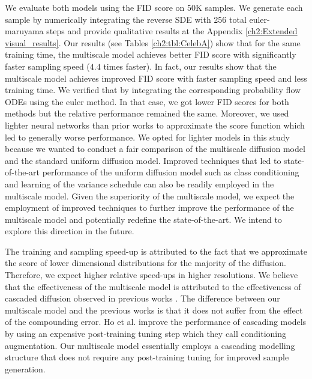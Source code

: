 We evaluate both models using the FID score on 50K samples. We generate each sample by numerically integrating the reverse SDE with 256 total euler-maruyama steps and provide qualitative results at the Appendix \ref{ch2:Extended visual_results}. Our results (see Tables  \ref{ch2:tbl:CelebA}) show that for the same training time, the multiscale model achieves better FID score with significantly faster sampling speed ($4.4$ times faster). In fact, our results show that the multiscale model achieves improved FID score with faster sampling speed and less training time. We verified that by integrating the corresponding probability flow ODEs using the euler method. In that case, we got lower FID scores for both methods but the relative performance remained the same. Moreover, we used lighter neural networks than prior works to approximate the score function which led to generally worse performance. We opted for lighter models in this study because we wanted to conduct a fair comparison of the multiscale diffusion model and the standard uniform diffusion model. Improved techniques that led to state-of-the-art performance of the uniform diffusion model such as class conditioning and learning of the variance schedule \cite{dhariwal2021diffusion_beats_gans} can also be readily employed in the multiscale model. Given the superiority of the multiscale model, we expect the employment of improved techniques to further improve the performance of the multiscale model and potentially redefine the state-of-the-art. We intend to explore this direction in the future.

The training and sampling speed-up is attributed to the fact that we approximate the score of lower dimensional distributions for the majority of the diffusion. Therefore, we expect higher relative speed-ups in higher resolutions. We believe that the effectiveness of the multiscale model is attributed to the effectiveness of cascaded diffusion observed in previous works \cite{saharia2021sr3, dhariwal2021diffusion_beats_gans}. The difference between our multiscale model and the previous works is that it does not suffer from the effect of the compounding error. Ho et al. \cite{saharia2021sr3} improve the performance of cascading models by using an expensive post-training tuning step which they call conditioning augmentation. Our multiscale model essentially employs a cascading modelling structure that does not require any post-training tuning for improved sample generation.



